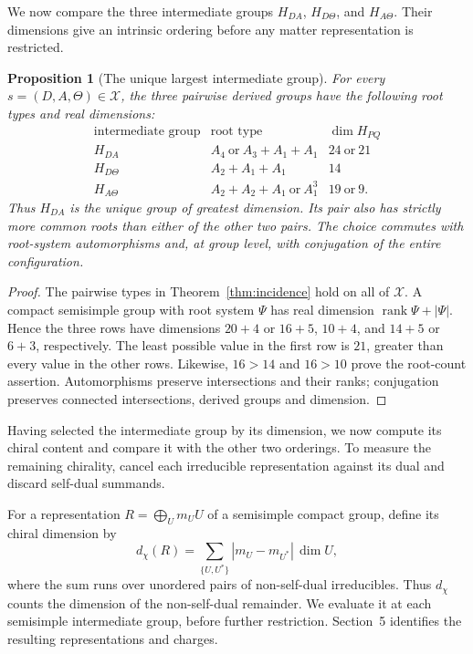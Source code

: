 \documentclass[11pt]{article}
\newtheorem{proposition}[theorem]{Proposition}
\theoremstyle{remark}
\begin{document}
We now compare the three intermediate groups \(H_{DA}\), \(H_{D\Theta}\), and
\(H_{A\Theta}\). Their dimensions give an intrinsic ordering before any
matter representation is restricted.

\begin{proposition}[The unique largest intermediate group]
\label{prop:largest-intermediate}
For every \(s=(D,A,\Theta)\in\mathcal X\), the three pairwise derived
groups have the following root types and real dimensions:
\[
\begin{array}{c|c|c}
\text{intermediate group} & \text{root type} & \dim H_{PQ}\\
\hline
H_{DA} & A_4\ \text{or}\ A_3+A_1+A_1 & 24\ \text{or}\ 21\\
H_{D\Theta} & A_2+A_1+A_1 & 14\\
H_{A\Theta} & A_2+A_2+A_1\ \text{or}\ A_1^3 & 19\ \text{or}\ 9.
\end{array}
\]
Thus \(H_{DA}\) is the unique group of greatest dimension. Its pair also
has strictly more common roots than either of the other two pairs.
The choice commutes with root-system automorphisms and, at group level,
with conjugation of the entire configuration.
\end{proposition}
\begin{proof}
The pairwise types in Theorem~\ref{thm:incidence} hold on all of
\(\mathcal X\). A compact semisimple group with root system \(\Psi\)
has real dimension \(\operatorname{rank}\Psi+|\Psi|\). Hence the
three rows have dimensions \(20+4\) or \(16+5\), \(10+4\), and
\(14+5\) or \(6+3\), respectively. The least possible value in the
first row is \(21\), greater than every value in the other rows.
Likewise, \(16>14\) and \(16>10\) prove the root-count assertion.
Automorphisms preserve intersections and their ranks; conjugation
preserves connected intersections, derived groups and dimension.
\end{proof}

Having selected the intermediate group by its dimension, we now compute
its chiral content and compare it with the other two orderings.
To measure the remaining chirality, cancel each irreducible representation
against its dual and discard self-dual summands.

For a representation \(R=\bigoplus_U m_U U\) of a semisimple compact group,
define its chiral dimension by
\[
 d_\chi(R)=
 \sum_{\{U,U^*\}}|m_U-m_{U^*}|\,\dim U,
\]
where the sum runs over unordered pairs of non-self-dual irreducibles.
Thus \(d_\chi\) counts the dimension of the non-self-dual remainder.
We evaluate it at each semisimple intermediate group, before further
restriction. Section~5 identifies the resulting representations and charges.
\end{document}
